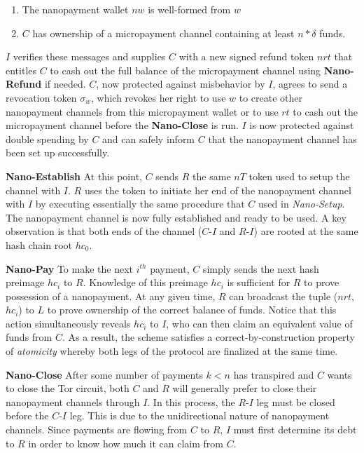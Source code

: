 \begin{enumerate}
\item The nanopayment wallet $nw$ is well-formed from $w$
\item $C$ has ownership of a micropayment channel containing at least $n *
  \delta$ funds.
\end{enumerate}

$I$ verifies these messages and supplies $C$ with a new signed refund token
$nrt$ that entitles $C$ to cash out the full balance of the micropayment channel
using \textbf{Nano-Refund} if needed.
$C$, now protected against misbehavior by $I$, agrees to send a revocation token
$\sigma_w$, which revokes her right to use $w$ to create other nanopayment
channels from this micropayment wallet or to use $rt$ to cash out the
micropayment channel before the \textbf{Nano-Close} is run. $I$ is now protected
against double spending by $C$ and can safely inform $C$ that the nanopayment
channel has been set up successfully.

\textbf{Nano-Establish} At this point, $C$ sends $R$ the same $nT$ token used to
setup the channel with $I$. $R$ uses the token to initiate her end of the
nanopayment channel with $I$ by executing essentially the same procedure that
$C$ used in \emph{Nano-Setup}. The nanopayment channel is now fully established
and ready to be used. A key observation is that both ends of the channel
($C$-$I$ and $R$-$I$) are rooted at the same hash chain root $hc_0$.

\textbf{Nano-Pay} To make the next $i^{th}$ payment, $C$ simply sends the next
hash preimage $hc_i$ to $R$. Knowledge of this preimage $hc_i$ is sufficient for
$R$ to prove possession of a nanopayment. At any given time, $R$ can broadcast
the tuple ($nrt$, $hc_i$) to $L$ to prove ownership of the correct balance of
funds. Notice that this action simultaneously reveals $hc_i$ to $I$, who can
then claim an equivalent value of funds from $C$. As a result, the scheme
satisfies a correct-by-construction property of \emph{atomicity} whereby both
legs of the protocol are finalized at the same time.

\textbf{Nano-Close} After some number of payments $k < n$ has transpired and $C$
wants to close the Tor circuit, both $C$ and $R$ will generally prefer to close
their nanopayment channels through $I$. In this process, the $R$-$I$ leg must be
closed before the $C$-$I$ leg. This is due to the unidirectional nature of
nanopayment channels. Since payments are flowing from $C$ to $R$, $I$ must first
determine its debt to $R$ in order to know how much it can claim from $C$.

